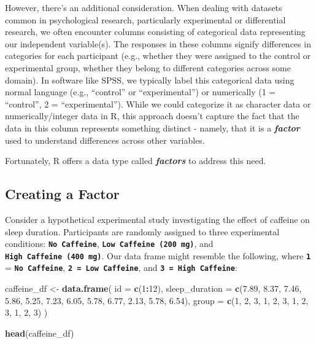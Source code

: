 \documentclass[
]{book}
\newenvironment{Shaded}{\begin{snugshade}}{\end{snugshade}}
\newcommand{\AttributeTok}[1]{\textcolor[rgb]{0.13,0.29,0.53}{#1}}
\newcommand{\DecValTok}[1]{\textcolor[rgb]{0.00,0.00,0.81}{#1}}
\newcommand{\FloatTok}[1]{\textcolor[rgb]{0.00,0.00,0.81}{#1}}
\newcommand{\FunctionTok}[1]{\textcolor[rgb]{0.13,0.29,0.53}{\textbf{#1}}}
\newcommand{\NormalTok}[1]{#1}
\newcommand{\OtherTok}[1]{\textcolor[rgb]{0.56,0.35,0.01}{#1}}
\newcommand{\SpecialCharTok}[1]{\textcolor[rgb]{0.81,0.36,0.00}{\textbf{#1}}}
\begin{document}
However, there's an additional consideration. When dealing with datasets common in psychological research, particularly experimental or differential research, we often encounter columns consisting of categorical data representing our independent variable(s). The responses in these columns signify differences in categories for each participant (e.g., whether they were assigned to the control or experimental group, whether they belong to different categories across some domain). In software like SPSS, we typically label this categorical data using normal language (e.g., ``control'' or ``experimental'') or numerically (1 = ``control'', 2 = ``experimental''). While we could categorize it as character data or numerically/integer data in R, this approach doesn't capture the fact that the data in this column represents something distinct - namely, that it is a \textbf{\emph{factor}} used to understand differences across other variables.

Fortunately, R offers a data type called \textbf{\emph{factors}} to address this need.

\hypertarget{creating-a-factor}{%
\subsection{Creating a Factor}\label{creating-a-factor}}

Consider a hypothetical experimental study investigating the effect of caffeine on sleep duration. Participants are randomly assigned to three experimental conditions: \textbf{\texttt{No\ Caffeine}}, \textbf{\texttt{Low\ Caffeine\ (200\ mg)}}, and \textbf{\texttt{High\ Caffeine\ (400\ mg)}}. Our data frame might resemble the following, where \textbf{\texttt{1}} = \textbf{\texttt{No\ Caffeine}}, \textbf{\texttt{2\ =\ Low\ Caffeine}}, and \textbf{\texttt{3\ =\ High\ Caffeine}}:

\begin{Shaded}
\begin{Highlighting}[]
\NormalTok{caffeine\_df }\OtherTok{\textless{}{-}} \FunctionTok{data.frame}\NormalTok{(}
  \AttributeTok{id =} \FunctionTok{c}\NormalTok{(}\DecValTok{1}\SpecialCharTok{:}\DecValTok{12}\NormalTok{),}
  \AttributeTok{sleep\_duration =} \FunctionTok{c}\NormalTok{(}\FloatTok{7.89}\NormalTok{, }\FloatTok{8.37}\NormalTok{, }\FloatTok{7.46}\NormalTok{, }\FloatTok{5.86}\NormalTok{, }\FloatTok{5.25}\NormalTok{, }\FloatTok{7.23}\NormalTok{, }\FloatTok{6.05}\NormalTok{, }\FloatTok{5.78}\NormalTok{, }\FloatTok{6.77}\NormalTok{, }\FloatTok{2.13}\NormalTok{, }\FloatTok{5.78}\NormalTok{,  }\FloatTok{6.54}\NormalTok{),}
  \AttributeTok{group =} \FunctionTok{c}\NormalTok{(}\DecValTok{1}\NormalTok{, }\DecValTok{2}\NormalTok{, }\DecValTok{3}\NormalTok{, }\DecValTok{1}\NormalTok{, }\DecValTok{2}\NormalTok{, }\DecValTok{3}\NormalTok{, }\DecValTok{1}\NormalTok{, }\DecValTok{2}\NormalTok{, }\DecValTok{3}\NormalTok{, }\DecValTok{1}\NormalTok{, }\DecValTok{2}\NormalTok{, }\DecValTok{3}\NormalTok{)}
\NormalTok{)}

\FunctionTok{head}\NormalTok{(caffeine\_df)}
\end{Highlighting}
\end{Shaded}
\end{document}

